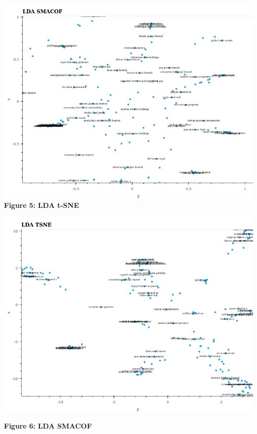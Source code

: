 \documentclass[11pt]{article}
\makeatletter
\def\maxwidth{\ifdim\Gin@nat@width>\linewidth\linewidth
    \else\Gin@nat@width\fi}
\let\Oldincludegraphics\includegraphics
\renewcommand{\includegraphics}[1]{\Oldincludegraphics[width=.8\maxwidth]{#1}}
\makeatother
\begin{document}
\includegraphics{../experiments/media/LDA SMACOF.png}\\

\textbf{Figure 5: LDA t-SNE}

\includegraphics{../experiments/media/LDA TSNE.png}

\textbf{Figure 6: LDA SMACOF}
\end{document}
